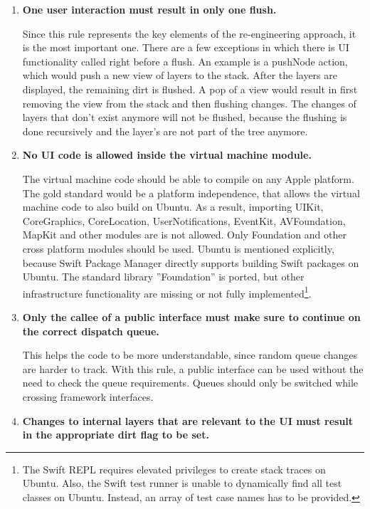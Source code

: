 \begin{enumerate}
	\item \textbf{One user interaction must result in only one flush.}
	
	Since this rule represents the key elements of the re-engineering approach, it is the most important one.
	There are a few exceptions in which there is \ac{UI} functionality called right before a flush.
	An example is a pushNode action, which would push a new view of layers to the stack.
	After the layers are displayed, the remaining dirt is flushed.
	A pop of a view would result in first removing the view from the stack and then flushing changes.
	The changes of layers that don't exist anymore will not be flushed, because the flushing is done recursively and the layer's are not part of the tree anymore.
	
	\item \textbf{No \ac{UI} code is allowed inside the virtual machine module.}
	
	The virtual machine code should be able to compile on any Apple platform.
	The gold standard would be a platform independence, that allows the virtual machine code to also build on Ubuntu.
	As a result, importing UIKit, CoreGraphics, CoreLocation, UserNotifications, EventKit, AVFoundation, MapKit and other modules are is not allowed.
	Only Foundation and other cross platform modules should be used.
	Ubuntu is mentioned explicitly, because Swift Package Manager directly supports building Swift packages on Ubuntu.
	The standard library ''Foundation'' is ported, but other infrastructure functionality are missing or not fully implemented\footnote{The Swift \ac{REPL} requires elevated privileges to create stack traces on Ubuntu. Also, the Swift test runner is unable to dynamically find all test classes on Ubuntu. Instead, an array of test case names has to be provided.}.
	
	\item \textbf{Only the callee of a public interface must make sure to continue on the correct dispatch queue.}
	
	This helps the code to be more understandable, since random queue changes are harder to track.
	With this rule, a public interface can be used without the need to check the queue requirements.
	Queues should only be switched while crossing framework interfaces.
	
	\item \textbf{Changes to internal layers that are relevant to the \ac{UI} must result in the appropriate dirt flag to be set.}
	

\end{enumerate}

